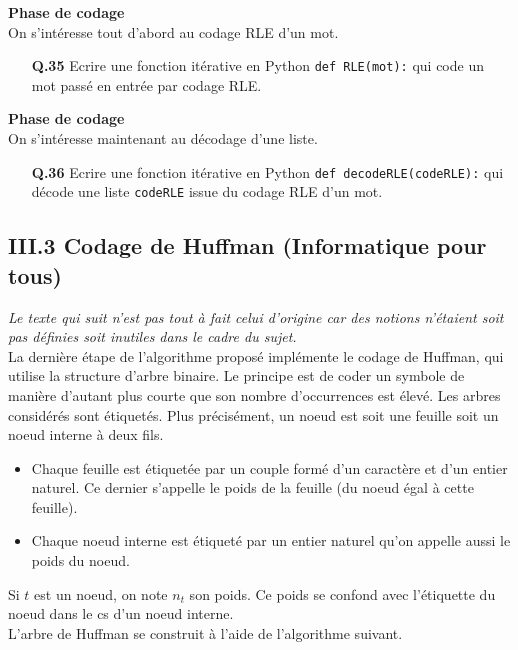 \documentclass[11pt,a4paper]{article}\nofiles
\begin{document}
\textbf{Phase de codage}\\
On s'int\'eresse tout d'abord au codage RLE d'un mot.
\begin{enumerate}
\item[{\bf Q.35}] Ecrire une fonction it\'erative en Python \texttt{def RLE(mot):} qui code un mot pass\'e en entr\'ee par codage RLE.
\end{enumerate}
\textbf{Phase de codage}\\
On s'int\'eresse maintenant au d\'ecodage d'une liste.
\begin{enumerate}
\item[{\bf Q.36}] Ecrire une fonction it\'erative en Python \texttt{def decodeRLE(codeRLE):} qui d\'ecode une liste \texttt{codeRLE} issue du codage RLE d'un mot.
\end{enumerate}

\subsection*{III.3 Codage de Huffman (Informatique pour tous)}
\textit{Le texte qui suit n'est pas tout \`a fait celui d'origine car des notions n'\'etaient soit pas d\'efinies soit inutiles dans le cadre du sujet.}\\

La derni\`ere \'etape de l'algorithme propos\'e impl\'emente le codage de Huffman, qui utilise la structure d'arbre binaire. 
Le principe est de coder un symbole de mani\`ere d'autant plus courte que son nombre d'occurrences est \'elev\'e. 
Les arbres consid\'er\'es sont \'etiquet\'es. Plus pr\'ecis\'ement, un noeud est soit une feuille soit un noeud interne \`a deux fils.
\begin{itemize}
\item Chaque feuille est \'etiquet\'ee par un couple form\'e d'un caract\`ere et d'un entier naturel. Ce dernier s'appelle le poids de la feuille (du noeud \'egal \`a cette feuille).
\item Chaque noeud interne est \'etiquet\'e par un entier naturel qu'on appelle aussi le poids du noeud.
\end{itemize}
Si $t$ est un noeud, on note $n_t$ son poids. Ce poids se confond avec l'\'etiquette du noeud dans le cs d'un noeud interne.\\
L'arbre de Huffman se construit \`a l'aide de l'algorithme suivant.\\
\end{document}
